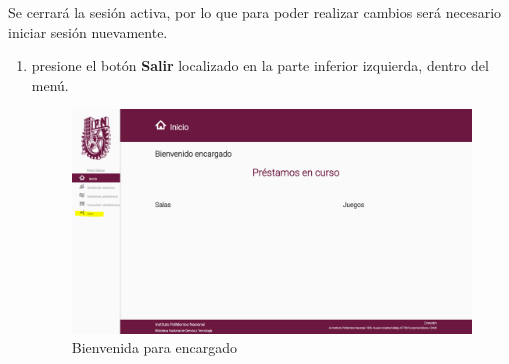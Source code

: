 Se cerrará la sesión activa, por lo que para poder realizar
cambios será necesario iniciar sesión nuevamente.
\begin{enumerate}
	\item presione el botón \textbf{Salir} localizado
		en la parte inferior izquierda, dentro del menú.
		
		\begin{figure}[hbtp]
		
		\includegraphics[scale=0.3]{images/Interfaz/IUGS10_logoutEncargado.png}
		\caption{Bienvenida para encargado}
	\end{figure}
		
\end{enumerate}

	